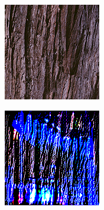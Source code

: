 \begin{figure}[]
\begin{subfigure}{\textwidth}
        \begin{subfigure}{0.19\textwidth}
            \centering
            \includegraphics[width=\textwidth]{images/04-experiment03/staircase_wood_target.jpg}
            \caption*{}
        \end{subfigure}
        \hfill
        \begin{subfigure}{0.19\textwidth}
            \centering
            \includegraphics[width=\textwidth]{images/04-experiment03/staircase_illum/wood/stats_im.jpg}

\end{subfigure}
\end{subfigure}
\end{figure}
